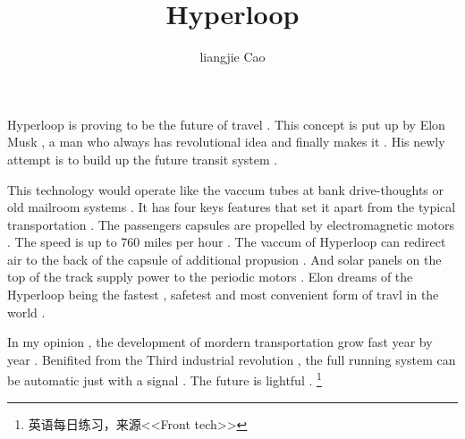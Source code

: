 \documentclass[50pt]{article}
\begin{document}
\title{Hyperloop}
\author{liangjie Cao}
\maketitle
\par
Hyperloop is proving to be the future of travel . This concept is put up by Elon Musk , a man who always has revolutional idea and finally makes it . His newly attempt is to build up the future transit system . \\
\par 
This technology would operate like the vaccum tubes at bank drive-thoughts or old mailroom systems . It has four keys features that set it apart from the typical transportation . The passengers capsules are propelled by electromagnetic motors . The speed is up to 760 miles per hour . The vaccum of Hyperloop can redirect air to the back of the capsule of additional propusion . And solar panels on the top of the track supply power to the periodic motors . Elon dreams of the Hyperloop being the fastest , safetest and most convenient form of travl in the world . \\
\par
In my opinion , the development of mordern transportation grow fast year by year . Benifited from the Third industrial revolution , the full running system can be automatic just with a signal . The future is lightful . 
\footnote{\centering 英语每日练习，来源<<Front tech>>}
\end{document}
